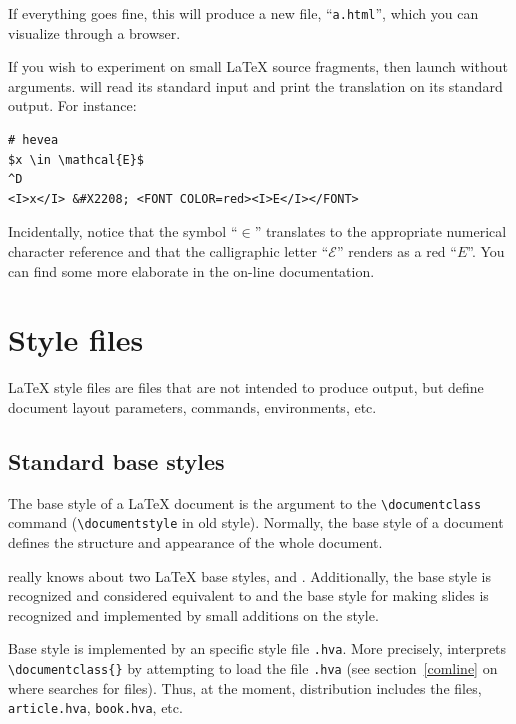 If everything goes fine, this will produce a new file,
``\texttt{a.html}'', which you can visualize through  a {\html} browser.


If you wish to experiment \hevea{} on small \LaTeX{} source fragments,
then launch \hevea{} without arguments. \hevea{} will read its
standard input and print the translation on its standard output.
For instance:
\begin{verbatim}
# hevea
$x \in \mathcal{E}$
^D
<I>x</I> &#X2208; <FONT COLOR=red><I>E</I></FONT>
\end{verbatim}
Incidentally, notice that the symbol ``$\in$'' translates to the
appropriate numerical  character reference and that the calligraphic letter
``$\mathcal{E}$'' renders as a red ``$E$''.
You can find some more elaborate  in the on-line
documentation.

\section{Style files}
\LaTeX{} style files are files that are not intended to produce output, but
define document layout parameters, commands, environments, etc.

\subsection{Standard base styles}

The base style of a \LaTeX{} document is the argument to the
\verb+\documentclass+ command (\verb+\documentstyle+ in old style).
Normally, the base style of a document defines the structure and
appearance of the whole document.



\noindent\hevea{} really knows about two \LaTeX{} base styles,
 and .
Additionally, the  base style is recognized and
considered equivalent to  and the
 base style for making slides is recognized and
implemented by small additions on the  style.


Base style  is implemented by an \hevea{} specific
style file \verb+.hva+.
More precisely, \hevea{} interprets
\verb+\documentclass{+\verb+}+ by attempting to load
the file \verb+.hva+ (see section~\ref{comline} on where
\hevea{} searches for files).
Thus, at the moment, \hevea{} distribution includes the files,
\texttt{article.hva}, \texttt{book.hva}, etc.



